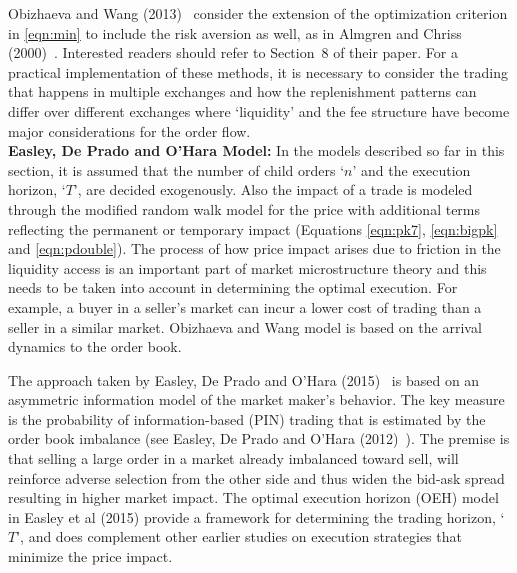 Obizhaeva and Wang (2013)~\cite{obizhaeva} consider the extension of the optimization criterion in \eqref{eqn:min} to include the risk aversion as well, as in Almgren and Chriss (2000)~\cite{alm2000}. Interested readers should refer to Section~8 of their paper. For a practical implementation of these methods, it is necessary to consider the trading that happens in multiple exchanges and how the replenishment patterns can differ over different exchanges where `liquidity' and the fee structure have become major considerations for the order flow. \\


\noindent\textbf{Easley, De Prado and O'Hara Model:} In the models described so far in this section, it is assumed that the number of child orders `$n$' and the execution horizon, `$T$', are decided exogenously. Also the impact of a trade is modeled through the modified random walk model for the price with additional terms reflecting the permanent or temporary impact (Equations \ref{eqn:pk7}, \ref{eqn:bigpk} and \ref{eqn:pdouble}). The process of how price impact arises due to friction in the liquidity access is an important part of market microstructure theory and this needs to be taken into account in determining the optimal execution. For example, a buyer in a seller's market can incur a lower cost of trading than a seller in a similar market. Obizhaeva and Wang model is based on the arrival dynamics to the order book. 


The approach taken by Easley, De Prado and O'Hara (2015)~\cite{prado2} is based on an asymmetric information model of the market maker's behavior. The key measure is the probability of information-based (PIN) trading that is estimated by the order book imbalance (see Easley, De Prado and O'Hara (2012)~\cite{prado3}). The premise is that selling a large order in a market already imbalanced toward sell, will reinforce adverse selection from the other side and thus widen the bid-ask spread resulting in higher market impact. The optimal execution horizon (OEH) model in Easley et al (2015) provide a framework for determining the trading horizon, `$T$', and does complement other earlier studies on execution strategies that minimize the price impact. 


